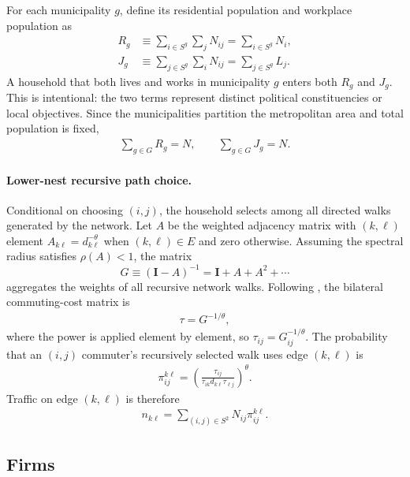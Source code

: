 \documentclass[12pt, a4paper]{article}
\theoremstyle{definition}
\theoremstyle{remark}
\begin{document}
For each municipality $g$, define its residential population and workplace population as
\begin{align}
    \label{eq:municipal-masses}
    R_g
    &\equiv
    \sum_{i\in S^g}\sum_j N_{ij}
    =
    \sum_{i\in S^g}N_i,
    \\
    J_g
    &\equiv
    \sum_{j\in S^g}\sum_i N_{ij}
    =
    \sum_{j\in S^g}L_j.
\end{align}
A household that both lives and works in municipality $g$ enters both $R_g$ and $J_g$. This is intentional: the two terms represent distinct political constituencies or local objectives. Since the municipalities partition the metropolitan area and total population is fixed,
\begin{align}
    \label{eq:mass-adding-up}
    \sum_{g\in G}R_g=N,
    \qquad
    \sum_{g\in G}J_g=N.
\end{align}

\paragraph{Lower-nest recursive path choice.}
Conditional on choosing $(i,j)$, the household selects among all directed walks generated by the network. Let $A$ be the weighted adjacency matrix with $(k,\ell)$ element $A_{k\ell}=d_{k\ell}^{-\theta}$ when $(k,\ell)\in E$ and zero otherwise. Assuming the spectral radius satisfies $\rho(A)<1$, the matrix
\[
G\equiv(\mathbf I-A)^{-1}=\mathbf I+A+A^2+\cdots
\]
aggregates the weights of all recursive network walks. Following \citet{Allen2022-ms}, the bilateral commuting-cost matrix is
\begin{align}
    \label{eq:pi-route}
    \tau=G^{-1/\theta},
\end{align}
where the power is applied element by element, so $\tau_{ij}=G_{ij}^{-1/\theta}$. The probability that an $(i,j)$ commuter's recursively selected walk uses edge $(k,\ell)$ is
\begin{align}
    \label{eq:edge-intensity}
    \pi_{ij}^{k\ell}
    = \left(\frac{\tau_{ij}}
    {\tau_{ik}d_{k\ell}\tau_{\ell j}}\right)^{\theta}.
\end{align}
Traffic on edge $(k,\ell)$ is therefore
\begin{align}
    \label{eq:edge-traffic}
    n_{k\ell} = \sum_{(i,j)\in S^{2}}N_{ij}\pi_{ij}^{k\ell}.
\end{align}

\subsection{Firms}
\label{sec:firms}
\end{document}
